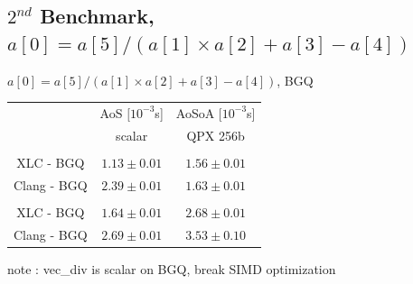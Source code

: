 \documentclass{beamer}
\begin{document}
\subsection*{$2^{nd}$ Benchmark, $a[0] = a[5]/(a[1] \times a[2]+a[3]-a[4])$}
\begin{frame}[fragile]
\begin{center}
$a[0] = a[5]/(a[1] \times a[2]+a[3]-a[4])$, BGQ

\vspace{0.5cm}

\begin{tabular}{ c  c | c  }
         & AoS $[10^{-3}$s]& AoSoA $[10^{-3}$s]\\
                        &   scalar &  QPX 256b \\
\hline
\color{C0}{float}   & & \\
   XLC - BGQ   &  \cellcolor{C2}$1.13\pm0.01$& $1.56\pm0.01$ \\
   Clang - BGQ   & $2.39\pm0.01$ &  \cellcolor{C2} $1.63\pm0.01$        \\
   \hline
    \color{C0}{double}                        &  &   \\
   XLC - BGQ   &  \cellcolor{C2}$1.64\pm0.01$ &     $2.68\pm0.01$  \\
   Clang - BGQ   &    \cellcolor{C2} $2.69\pm0.01$  &      $3.53\pm0.10$ \\
\hline
\end{tabular}
\end{center}
\vspace{0.5cm}

note : vec\_div is scalar on BGQ, break SIMD optimization

\end{frame}

\end{document}
